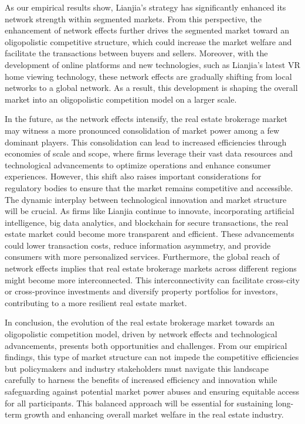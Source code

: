 \documentclass[11pt]{article}
\begin{document}
As our empirical results show, Lianjia's strategy has significantly enhanced its network strength within segmented markets. From this perspective, the enhancement of network effects further drives the segmented market toward an oligopolistic competitive structure, which could increase the market welfare and facilitate the transactions between buyers and sellers. Moreover, with the development of online platforms and new technologies, such as Lianjia's latest VR home viewing technology, these network effects are gradually shifting from local networks to a global network. As a result, this development is shaping the overall market into an oligopolistic competition model on a larger scale.

In the future, as the network effects intensify, the real estate brokerage market may witness a more pronounced consolidation of market power among a few dominant players. This consolidation can lead to increased efficiencies through economies of scale and scope, where firms leverage their vast data resources and technological advancements to optimize operations and enhance consumer experiences. However, this shift also raises important considerations for regulatory bodies to ensure that the market remains competitive and accessible. The dynamic interplay between technological innovation and market structure will be crucial. As firms like Lianjia continue to innovate, incorporating artificial intelligence, big data analytics, and blockchain for secure transactions, the real estate market could become more transparent and efficient. These advancements could lower transaction costs, reduce information asymmetry, and provide consumers with more personalized services. Furthermore, the global reach of network effects implies that real estate brokerage markets across different regions might become more interconnected. This interconnectivity can facilitate cross-city or cross-province investments and diversify property portfolios for investors, contributing to a more resilient real estate market.

In conclusion, the evolution of the real estate brokerage market towards an oligopolistic competition model, driven by network effects and technological advancements, presents both opportunities and challenges. From our empirical findings, this type of market structure can not impede the competitive efficiencies but policymakers and industry stakeholders must navigate this landscape carefully to harness the benefits of increased efficiency and innovation while safeguarding against potential market power abuses and ensuring equitable access for all participants. This balanced approach will be essential for sustaining long-term growth and enhancing overall market welfare in the real estate industry.
\end{document}
